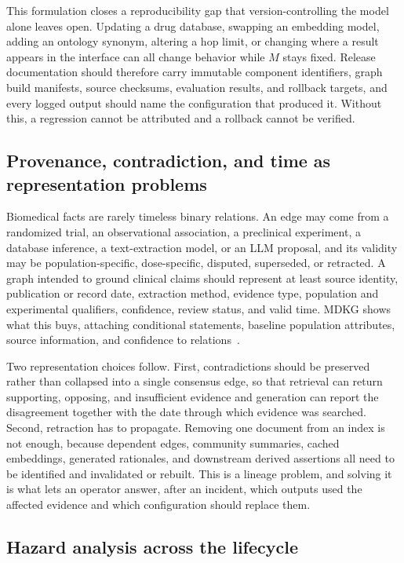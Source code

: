 This formulation closes a reproducibility gap that version-controlling the model alone leaves open. Updating a drug database, swapping an embedding model, adding an ontology synonym, altering a hop limit, or changing where a result appears in the interface can all change behavior while $M$ stays fixed. Release documentation should therefore carry immutable component identifiers, graph build manifests, source checksums, evaluation results, and rollback targets, and every logged output should name the configuration that produced it. Without this, a regression cannot be attributed and a rollback cannot be verified.

\subsection{Provenance, contradiction, and time as representation problems}

Biomedical facts are rarely timeless binary relations. An edge may come from a randomized trial, an observational association, a preclinical experiment, a database inference, a text-extraction model, or an LLM proposal, and its validity may be population-specific, dose-specific, disputed, superseded, or retracted. A graph intended to ground clinical claims should represent at least source identity, publication or record date, extraction method, evidence type, population and experimental qualifiers, confidence, review status, and valid time. MDKG shows what this buys, attaching conditional statements, baseline population attributes, source information, and confidence to relations~\cite{gao2025mdkg}.

Two representation choices follow. First, contradictions should be preserved rather than collapsed into a single consensus edge, so that retrieval can return supporting, opposing, and insufficient evidence and generation can report the disagreement together with the date through which evidence was searched. Second, retraction has to propagate. Removing one document from an index is not enough, because dependent edges, community summaries, cached embeddings, generated rationales, and downstream derived assertions all need to be identified and invalidated or rebuilt. This is a lineage problem, and solving it is what lets an operator answer, after an incident, which outputs used the affected evidence and which configuration should replace them.

\subsection{Hazard analysis across the lifecycle}

